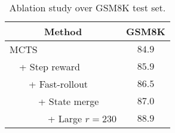 
\begin{table}[!htb]
    \centering
    \begin{tabular}{cl|c}
        \multicolumn{2}{c|}{Method}         & GSM8K \\
        \hline
        \multicolumn{2}{l|}{MCTS}           & $84.9$ \\
        \hline
           & + Step reward                  & $85.9$ \\
           & ~~+ Fast-rollout               & $86.5$ \\
           & ~~~~+ State merge              & $87.0$ \\
           & ~~~~~~+ Large $r=230$          & $88.9$ \\
        \hline
    \end{tabular}
    \vspace{4mm}
    \caption{Ablation study over GSM8K test set.}
    \label{tab:ablation_result}
\end{table}
